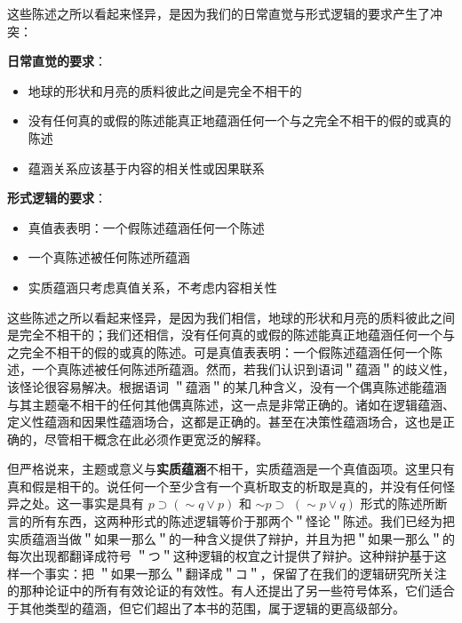 \begin{examplebox}[title=直觉与逻辑的冲突]
这些陈述之所以看起来怪异，是因为我们的日常直觉与形式逻辑的要求产生了冲突：

\textbf{日常直觉的要求}：
\begin{itemize}
\item 地球的形状和月亮的质料彼此之间是完全不相干的
\item 没有任何真的或假的陈述能真正地蕴涵任何一个与之完全不相干的假的或真的陈述
\item 蕴涵关系应该基于内容的相关性或因果联系
\end{itemize}

\textbf{形式逻辑的要求}：
\begin{itemize}
\item 真值表表明：一个假陈述蕴涵任何一个陈述
\item 一个真陈述被任何陈述所蕴涵
\item 实质蕴涵只考虑真值关系，不考虑内容相关性
\end{itemize}
\end{examplebox}

这些陈述之所以看起来怪异，是因为我们相信，地球的形状和月亮的质料彼此之间是完全不相干的；我们还相信，没有任何真的或假的陈述能真正地蕴涵任何一个与之完全不相干的假的或真的陈述。可是真值表表明：一个假陈述蕴涵任何一个陈述，一个真陈述被任何陈述所蕴涵。然而，若我们认识到语词＂蕴涵＂的歧义性，该怪论很容易解决。根据语词 ＂蕴涵＂的某几种含义，没有一个偶真陈述能蕴涵与其主题毫不相干的任何其他偶真陈述，这一点是非常正确的。诸如在逻辑蕴涵、定义性蕴涵和因果性蕴涵场合，这都是正确的。甚至在决策性蕴涵场合，这也是正确的，尽管相干概念在此必须作更宽泛的解释。

但严格说来，主题或意义与\textbf{实质蕴涵}不相干，实质蕴涵是一个真值函项。这里只有真和假是相干的。说任何一个至少含有一个真析取支的析取是真的，并没有任何怪异之处。这一事实是具有 $p \supset(\sim q \vee p)$ 和 $\sim p \supset$ $(\sim p \vee q)$ 形式的陈述所断言的所有东西，这两种形式的陈述逻辑等价于那两个＂怪论＂陈述。我们已经为把实质蕴涵当做＂如果一那么＂的一种含义提供了辩护，并且为把＂如果一那么＂的每次出现都翻译成符号 ＂つ＂这种逻辑的权宜之计提供了辩护。这种辩护基于这样一个事实：把 ＂如果一那么＂翻译成＂コ＂，保留了在我们的逻辑研究所关注的那种论证中的所有有效论证的有效性。有人还提出了另一些符号体系，它们适合于其他类型的蕴涵，但它们超出了本书的范围，属于逻辑的更高级部分。

